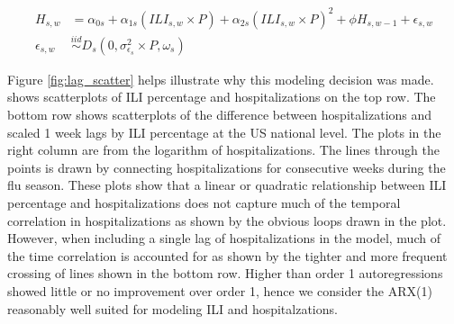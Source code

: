 \begin{equation}
    \begin{aligned}
    \label{eq:final_hosp}
    H_{s,w} &= \alpha_{0s} + \alpha_{1s} (ILI_{s,w} \times P) + \alpha_{2s} 
    (ILI_{s,w} \times P)^2 + \phi H_{s,w-1} + \epsilon_{s,w}\\ 
    \epsilon_{s,w} &\overset{iid}{\sim} D_s(0, \sigma_{\epsilon_s}^2 \times P, 
    \omega_s) %
    \end{aligned}
\end{equation}

Figure \ref{fig:lag_scatter} helps
illustrate why this modeling decision was made.
shows scatterplots of ILI percentage and hospitalizations on the top row.
The bottom row shows scatterplots of the difference between hospitalizations and 
scaled 1 week 
lags by ILI percentage at the US national level. The plots in the right column
are from the logarithm of hospitalizations. The lines through the points is
drawn by connecting hospitalizations for consecutive weeks during the flu 
season.
These plots show that a linear or quadratic relationship between ILI percentage 
and hospitalizations does not capture much of the temporal correlation in 
hospitalizations as shown by the obvious loops drawn in the plot. 
However, when including a 
single lag of hospitalizations in the model, much of the time correlation is
accounted for as shown by the tighter and more frequent crossing of lines shown
in the bottom row. Higher than order 1 autoregressions showed little or no 
improvement over order 1, hence we consider the ARX(1) reasonably well 
suited for modeling ILI and hospitalzations. 

